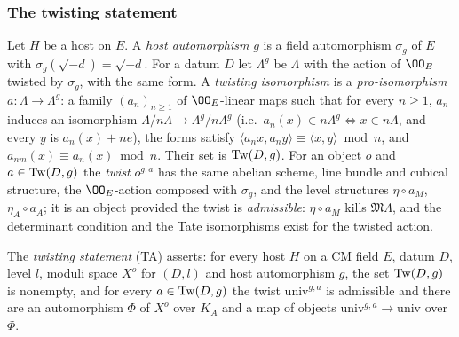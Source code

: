 \subsubsection*{The twisting statement}
Let $H$ be a host on $E$. A \emph{host automorphism} $g$ is a field automorphism $\sigma_g$ of $E$ with
$\sigma_g(\sqrt{-d})=\sqrt{-d}$. For a datum $D$ let $\Lambda^g$ be $\Lambda$ with the action of $\OO_E$
twisted by $\sigma_g$, with the same form. A \emph{twisting isomorphism} is a \emph{pro-isomorphism}
$a\colon\Lambda\to\Lambda^g$: a family $(a_n)_{n\ge1}$ of $\OO_E$-linear maps such that for every $n\ge1$,
$a_n$ induces an isomorphism $\Lambda/n\Lambda\to\Lambda^g/n\Lambda^g$ (i.e.\
$a_n(x)\in n\Lambda^g\Leftrightarrow x\in n\Lambda$, and every $y$ is $a_n(x)+ne$), the forms satisfy
$\langle a_nx,a_ny\rangle\equiv\langle x,y\rangle\bmod n$, and $a_{nm}(x)\equiv a_n(x)\bmod n$. Their set
is $\mathrm{Tw}(D,g)$. For an object $o$ and $a\in\mathrm{Tw}(D,g)$ the \emph{twist} $o^{g,a}$ has the same
abelian scheme, line bundle and cubical structure, the $\OO_E$-action composed with $\sigma_g$, and the
level structures $\eta\circ a_M$, $\eta_A\circ a_A$; it is an object provided the twist is
\emph{admissible}: $\eta\circ a_M$ kills $\mathfrak M\Lambda$, and the determinant condition and the Tate
isomorphisms exist for the twisted action.

\begin{definition}[Twisting statement]\label{pf:towergeo:def-twistaut}
The \emph{twisting statement} \textup{(TA)} asserts: for every host $H$ on a CM field $E$, datum $D$,
level $l$, moduli space $X^o$ for $(D,l)$ and host automorphism $g$, the set $\mathrm{Tw}(D,g)$ is
nonempty, and for every $a\in\mathrm{Tw}(D,g)$ the twist $\mathrm{univ}^{g,a}$ is admissible and there are
an automorphism $\Phi$ of $X^o$ over $K_A$ and a map of objects $\mathrm{univ}^{g,a}\to\mathrm{univ}$ over
$\Phi$.
\end{definition}

